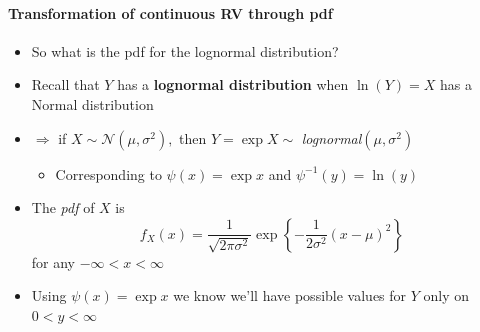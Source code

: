 \documentclass[smaller]{beamer}\usepackage[]{graphicx}\usepackage[]{color}
\newcommand{\N}{\mathcal{N}}
\newenvironment{stepitemize}{\begin{itemize}[<+->]}{\end{itemize} }
\begin{document}
\begin{frame}{\secname}
  \framesubtitle{Transformation of continuous RV through pdf }

  \begin{example}
  \begin{stepitemize}
  \item So what is the pdf for the lognormal distribution?

  \item Recall that $Y$ has a \textbf{lognormal distribution} when $\ln \left(
  Y\right) =X$ has a Normal distribution

  \item $\Rightarrow $ if $X\sim \N\left( \mu ,\sigma ^{2}\right) ,$ then $%
  Y=\exp X \sim $ \emph{lognormal}$\left( \mu ,\sigma ^{2}\right) $

  \begin{stepitemize}
  \item Corresponding to $\psi \left( x\right) =\exp x$ and $\psi
  ^{-1}\left( y\right) =\ln (y)$
  \end{stepitemize}

  \item The \emph{pdf} of $X$ is
  \begin{equation*}
  f_{X}\left( x\right) =\frac{1}{\sqrt{2\pi \sigma ^{2}}}\exp{ \left\{ -\frac{1%
  }{2\sigma ^{2}}\left( x-\mu \right) ^{2}\right\}}
  \end{equation*}%
  for any $-\infty <x<\infty $

  \item Using $\psi \left( x\right) =\exp x$ we know we'll have possible
  values for $Y$ only on $0<y<\infty $
  \end{stepitemize}
  \end{example}
\end{frame}
\end{document}
